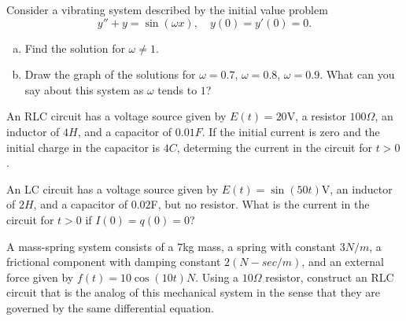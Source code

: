\documentclass[12pt,letterpaper]{hmcpset}
\begin{document}
\begin{solution}
    \vfill
\end{solution}
\clearpage

\begin{problem}[F4]
    Consider a vibrating system described by the initial value problem
    \[
        y''+y = \sin(\omega x),\quad y(0)=y'(0)=0.
    \]
    \begin{enumerate}[(a)]
        \item Find the solution for $\omega\neq 1$.
        \item Draw the graph of the solutions for $\omega=0.7$,
            $\omega=0.8$, $\omega=0.9$. What can you say about
            this system as $\omega$ tends to $1$?
    \end{enumerate}
\end{problem}

\begin{solution}
    \vfill
\end{solution}
\clearpage

\begin{problem}[F5]
    An RLC circuit has a voltage source given by $E(t)=20$V,
    a resistor $100\Omega$, an inductor of $4H$, and a capacitor
    of $0.01F$. If the initial current is zero and the initial charge
    in the capacitor is $4C$, determing the current in the circuit for
    $t > 0$.
\end{problem}

\begin{solution}
    \vfill
\end{solution}
\clearpage

\begin{problem}[F6]
    An LC circuit has a voltage source given by $E(t)=\sin(50t)$V,
    an inductor of $2H$, and a capacitor of $0.02$F, but no
    resistor. What is the current in the circuit for $t>0$ if
    $I(0)=q(0)=0$?
\end{problem}

\begin{solution}
    \vfill
\end{solution}
\clearpage

\begin{problem}[F7]
    A mass-spring system consists of a $7$kg mass, a spring with constant $3N/m$,
    a frictional component with damping constant $2(N - sec/m)$, and an external
    force given by $f(t)=10\cos(10t)N$. Using a $10\Omega$ resistor, construct an
    RLC circuit that is the analog of this mechanical system in the sense that they
    are governed by the same differential equation.
\end{problem}
\end{document}
